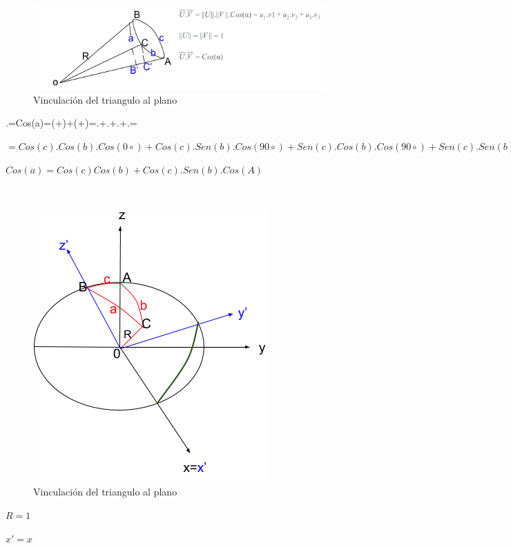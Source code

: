\documentclass[spanish]{article}
\begin{document}
\begin{figure}[H]
  \centering
    \includegraphics{2.png}
  \caption{Vinculación del triangulo al plano}
  \label{fig:ejemplo}
\end{figure}


.=Cos(a)=(+)+(+)=.+.+.+.=

\(= Cos(c).Cos(b).Cos(0 \circ ) + Cos(c).Sen(b).Cos(90 \circ ) + Sen(c).Cos(b).Cos(90 \circ ) + Sen(c).Sen(b).Cos(A)\)

\(Cos(a) = Cos(c)Cos(b) + Cos(c).Sen(b).Cos(A)\)

\\

\begin{figure}[H]
  \centering
    \includegraphics{3.png}
    \caption{Vinculación del triangulo al plano}
  \label{fig:ejemplo}
\end{figure}


\(R = 1\)

\(x' = x\)
\end{document}
